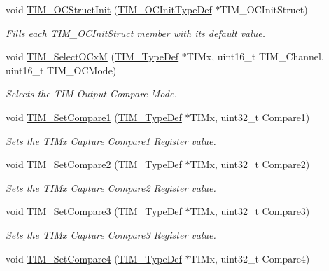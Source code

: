 \begin{DoxyCompactItemize}
void \hyperlink{group___t_i_m___group2_ga394683c78ae02837882e36014e11643e}{T\+I\+M\+\_\+\+O\+C\+Struct\+Init} (\hyperlink{struct_t_i_m___o_c_init_type_def}{T\+I\+M\+\_\+\+O\+C\+Init\+Type\+Def} $\ast$T\+I\+M\+\_\+\+O\+C\+Init\+Struct)
\begin{DoxyCompactList}\small\item\em Fills each T\+I\+M\+\_\+\+O\+C\+Init\+Struct member with its default value. \end{DoxyCompactList}\item 
void \hyperlink{group___t_i_m___group2_ga83ea0af5a7c1af521236ce5e4d2c42b0}{T\+I\+M\+\_\+\+Select\+O\+CxM} (\hyperlink{struct_t_i_m___type_def}{T\+I\+M\+\_\+\+Type\+Def} $\ast$T\+I\+Mx, uint16\+\_\+t T\+I\+M\+\_\+\+Channel, uint16\+\_\+t T\+I\+M\+\_\+\+O\+C\+Mode)
\begin{DoxyCompactList}\small\item\em Selects the T\+IM Output Compare Mode. \end{DoxyCompactList}\item 
void \hyperlink{group___t_i_m___group2_ga48631e66c32bb905946664f4722b2546}{T\+I\+M\+\_\+\+Set\+Compare1} (\hyperlink{struct_t_i_m___type_def}{T\+I\+M\+\_\+\+Type\+Def} $\ast$T\+I\+Mx, uint32\+\_\+t Compare1)
\begin{DoxyCompactList}\small\item\em Sets the T\+I\+Mx Capture Compare1 Register value. \end{DoxyCompactList}\item 
void \hyperlink{group___t_i_m___group2_ga3de36754f3ba5d46b9ef2bf8e77575c7}{T\+I\+M\+\_\+\+Set\+Compare2} (\hyperlink{struct_t_i_m___type_def}{T\+I\+M\+\_\+\+Type\+Def} $\ast$T\+I\+Mx, uint32\+\_\+t Compare2)
\begin{DoxyCompactList}\small\item\em Sets the T\+I\+Mx Capture Compare2 Register value. \end{DoxyCompactList}\item 
void \hyperlink{group___t_i_m___group2_gac372fbbbbc20329802659dd6c6b4e051}{T\+I\+M\+\_\+\+Set\+Compare3} (\hyperlink{struct_t_i_m___type_def}{T\+I\+M\+\_\+\+Type\+Def} $\ast$T\+I\+Mx, uint32\+\_\+t Compare3)
\begin{DoxyCompactList}\small\item\em Sets the T\+I\+Mx Capture Compare3 Register value. \end{DoxyCompactList}\item 
void \hyperlink{group___t_i_m___group2_ga99ba6c2afa87a239c9d32a49762b4245}{T\+I\+M\+\_\+\+Set\+Compare4} (\hyperlink{struct_t_i_m___type_def}{T\+I\+M\+\_\+\+Type\+Def} $\ast$T\+I\+Mx, uint32\+\_\+t Compare4)

\end{DoxyCompactItemize}
